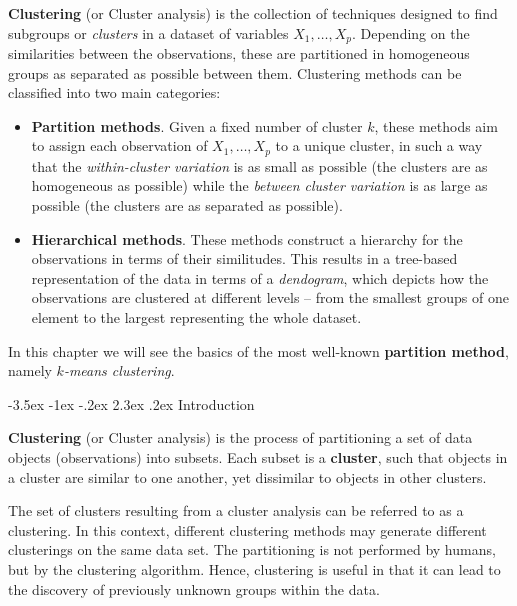 \documentclass[]{book}
\makeatletter
\providecommand{\tightlist}{%
  \setlength{\itemsep}{0pt}\setlength{\parskip}{0pt}}
\renewcommand\section{\@startsection {section}{1}{\z@}%
                                   {-3.5ex \@plus -1ex \@minus -.2ex}%
                                   {2.3ex \@plus.2ex}%
                                   {\normalfont\Large\bfseries\color{ForestGreen}}}
\theoremstyle{definition}
\theoremstyle{definition}
\theoremstyle{definition}
\theoremstyle{remark}
\makeatother
\begin{document}
\textbf{Clustering} (or Cluster analysis) is the collection of
techniques designed to find subgroups or \emph{clusters} in a dataset of
variables \(X_1,\ldots,X_p\). Depending on the similarities between the
observations, these are partitioned in homogeneous groups as separated
as possible between them. Clustering methods can be classified into two
main categories:

\begin{itemize}
\tightlist
\item
  \textbf{Partition methods}. Given a fixed number of cluster \(k\),
  these methods aim to assign each observation of \(X_1,\ldots,X_p\) to
  a unique cluster, in such a way that the \emph{within-cluster
  variation} is as small as possible (the clusters are as homogeneous as
  possible) while the \emph{between cluster variation} is as large as
  possible (the clusters are as separated as possible).
\item
  \textbf{Hierarchical methods}. These methods construct a hierarchy for
  the observations in terms of their similitudes. This results in a
  tree-based representation of the data in terms of a \emph{dendogram},
  which depicts how the observations are clustered at different levels
  -- from the smallest groups of one element to the largest representing
  the whole dataset.
\end{itemize}

In this chapter we will see the basics of the most well-known
\textbf{partition method}, namely \emph{\(k\)-means clustering}.

\section{Introduction}\label{introduction-4}

\textbf{Clustering} (or Cluster analysis) is the process of partitioning
a set of data objects (observations) into subsets. Each subset is a
\textbf{cluster}, such that objects in a cluster are similar to one
another, yet dissimilar to objects in other clusters.

The set of clusters resulting from a cluster analysis can be referred to
as a clustering. In this context, different clustering methods may
generate different clusterings on the same data set. The partitioning is
not performed by humans, but by the clustering algorithm. Hence,
clustering is useful in that it can lead to the discovery of previously
unknown groups within the data.
\end{document}
